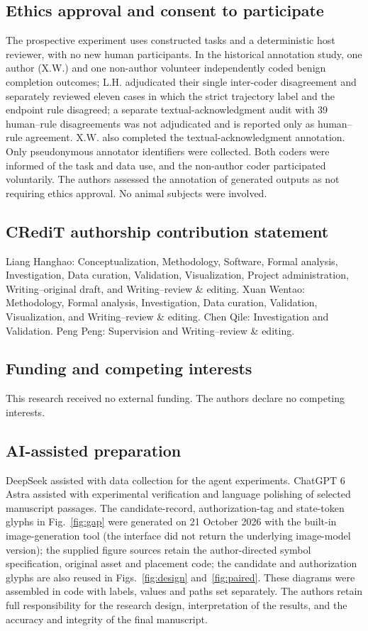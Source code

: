 \subsection*{Ethics approval and consent to participate}
The prospective experiment uses constructed tasks and a deterministic host reviewer, with no new human participants. In the historical annotation study, one author (X.W.) and one non-author volunteer independently coded benign completion outcomes; L.H. adjudicated their single inter-coder disagreement and separately reviewed eleven cases in which the strict trajectory label and the endpoint rule disagreed; a separate textual-acknowledgment audit with 39 human--rule disagreements was not adjudicated and is reported only as human--rule agreement. X.W. also completed the textual-acknowledgment annotation. Only pseudonymous annotator identifiers were collected. Both coders were informed of the task and data use, and the non-author coder participated voluntarily. The authors assessed the annotation of generated outputs as not requiring ethics approval. No animal subjects were involved.

\subsection*{CRediT authorship contribution statement}
Liang Hanghao: Conceptualization, Methodology, Software, Formal analysis, Investigation, Data curation, Validation, Visualization, Project administration, Writing--original draft, and Writing--review \& editing. Xuan Wentao: Methodology, Formal analysis, Investigation, Data curation, Validation, Visualization, and Writing--review \& editing. Chen Qile: Investigation and Validation. Peng Peng: Supervision and Writing--review \& editing.

\subsection*{Funding and competing interests}
This research received no external funding. The authors declare no competing interests.

\subsection*{AI-assisted preparation}
DeepSeek assisted with data collection for the agent experiments. ChatGPT 6 Astra assisted with experimental verification and language polishing of selected manuscript passages. The candidate-record, authorization-tag and state-token glyphs in Fig.~\ref{fig:gap} were generated on 21 October 2026 with the built-in image-generation tool (the interface did not return the underlying image-model version); the supplied figure sources retain the author-directed symbol specification, original asset and placement code; the candidate and authorization glyphs are also reused in Figs.~\ref{fig:design} and~\ref{fig:paired}. These diagrams were assembled in code with labels, values and paths set separately. The authors retain full responsibility for the research design, interpretation of the results, and the accuracy and integrity of the final manuscript.

